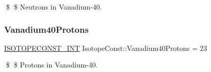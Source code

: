\$ \$ Neutrons in Vanadium-\/40. \mbox{\label{group___isotope_const-_vanadium-_v40_gaf48e55d973210659cf3232bd7055bb26}} 
\subsubsection{\texorpdfstring{Vanadium40\+Protons}{Vanadium40Protons}}
{\footnotesize\ttfamily \mbox{\hyperlink{group___isotope_const-_macros_ga5f18360b3e99483a35c32d789e62621c}{I\+S\+O\+T\+O\+P\+E\+C\+O\+N\+S\+T\+\_\+\+I\+NT}} Isotope\+Const\+::\+Vanadium40\+Protons = 23}

\$ \$ Protons in Vanadium-\/40. 